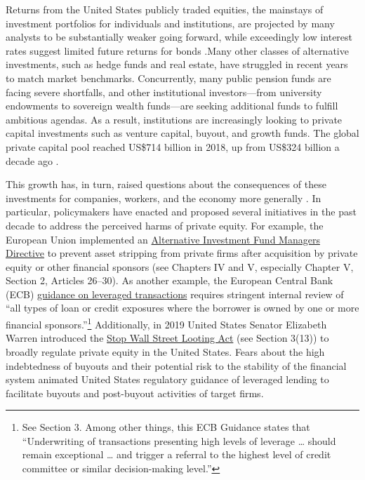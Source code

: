 \documentclass[
]{WileySix}
\begin{document}
Returns from the United States publicly traded equities, the mainstays of investment portfolios for individuals and institutions, are projected by many analysts to be substantially weaker going forward, while exceedingly low interest rates suggest limited future returns for bonds \citep{perianan2020}.Many other classes of alternative investments, such as hedge funds and real estate, have struggled in recent years to match market benchmarks. Concurrently, many public pension funds are facing severe shortfalls, and other institutional investors---from university endowments to sovereign wealth funds---are seeking additional funds to fulfill ambitious agendas. As a result, institutions are increasingly looking to private capital investments such as venture capital, buyout, and growth funds. The global private capital pool reached US\$714 billion in 2018, up from US\$324 billion a decade ago \citep{baincompany2019}.

This growth has, in turn, raised questions about the consequences of these investments for companies, workers, and the economy more generally \citep{privatecapitalresearchinstitute2017}. In particular, policymakers have enacted and proposed several initiatives in the past decade to address the perceived harms of private equity. For example, the European Union implemented an \href{https://eur-lex.europa.eu/legal-content/EN/TXT/PDF/?uri=CELEX:32011L0061\&from=EN}{Alternative Investment Fund Managers Directive} to prevent asset stripping from private firms after acquisition by private equity or other financial sponsors (see Chapters IV and V, especially Chapter V, Section 2, Articles 26--30). As another example, the European Central Bank (ECB) \href{https://www.bankingsupervision.europa.eu/ecb/pub/pdf/ssm.leveraged_transactions_guidance_201705.en.pdf}{guidance on leveraged transactions} requires stringent internal review of ``all types of loan or credit exposures where the borrower is owned by one or more financial sponsors.''\footnote{See Section 3. Among other things, this ECB Guidance states that ``Underwriting of transactions presenting high levels of leverage \ldots{} should remain exceptional \ldots{} and trigger a referral to the highest level of credit committee or similar decision-making level.''} Additionally, in 2019 United States Senator Elizabeth Warren introduced the \href{https://www.warren.senate.gov/imo/media/doc/2019.7.17\%20Stop\%20Wall\%20Street\%20Looting\%20Act\%20Text.pdf}{Stop Wall Street Looting Act} (see Section 3(13)) to broadly regulate private equity in the United States. Fears about the high indebtedness of buyouts and their potential risk to the stability of the financial system animated United States regulatory guidance of leveraged lending to facilitate buyouts and post-buyout activities of target firms.
\end{document}
